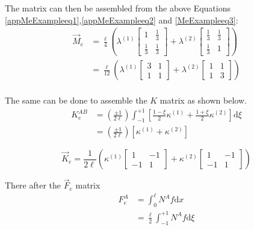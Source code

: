  The matrix can then be assembled from the above Equations \ref{appMeExampleeq1},\ref{appMeExampleeq2} and \ref{MeExampleeq3}:
\begin{equation}\label{appMeassembled}
\begin{aligned}
\vec{M}_e &= \frac{\ell}{4} \left(
	\lambda^{(1)} \begin{bmatrix} 1 & \frac{1}{3} \\ \frac{1}{3} & \frac{1}{3} \end{bmatrix}
	+ \lambda^{(2)} \begin{bmatrix} \frac{1}{3} & \frac{1}{3} \\ \frac{1}{3} & 1 \end{bmatrix}
\right) \\
&= \frac{\ell}{12} \left(
	\lambda^{(1)} \begin{bmatrix} 3 & 1 \\ 1 & 1 \end{bmatrix}
	+ \lambda^{(2)} \begin{bmatrix} 1 & 1 \\ 1 & 3 \end{bmatrix}
\right) \\
\end{aligned}
\end{equation}

The same can be done to assemble the $K$ matrix as shown below.
\begin{equation}%
\begin{aligned}
K_e^{AB} &= \left(\frac{\pm 1}{2\ell}\right) \int_{-1}^{+1} \left[
	\frac{1-\xi}{2} \kappa^{(1)}
	+ \frac{1+\xi}{2} \kappa^{(2)}
\right] \text{d}\xi \\
&= \left(\frac{\pm 1}{2\ell}\right) \left[ \kappa^{(1)} + \kappa^{(2)} \right]
\end{aligned}
\end{equation}


\begin{equation}%
\vec{K}_e = \frac{1}{2\ell} \left(
	\kappa^{(1)} \begin{bmatrix} 1 & -1 \\ -1 & 1 \end{bmatrix}
	+ \kappa^{(2)} \begin{bmatrix} 1 & -1 \\ -1 & 1 \end{bmatrix}
\right)
\end{equation}

There after the $\vec{F}_e$ matrix
\begin{equation}%
\begin{aligned}
F_e^A &= \int_0^\ell N^A f \text{d}x \\
&= \frac{\ell}{2} \int_{-1}^{+1} N^A f \text{d} \xi
\end{aligned}
\end{equation}


